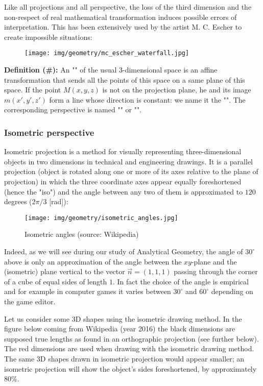 	Like all projections and all perspective, the loss of the third dimension and the non-respect of real mathematical transformation induces possible errors of interpretation. This has been extensively used by the artist M. C. Escher to create impossible situations:
	\begin{figure}[H]
		\centering
		\texttt{[image: img/geometry/mc\_escher\_waterfall.jpg]}
	\end{figure}
	\textbf{Definition (\#\mydef):} An "" of the usual 3-dimensional space is an affine transformation that sends all the points of this space on a same plane of this space. If the point $M (x, y, z)$ is not on the projection plane, he and its image $m (x ', y', z ')$ form a line whose direction is constant: we name it the "". The corresponding perspective is named "" or "".
	
	
	\pagebreak
	\subsubsection{Isometric perspective}
	Isometric projection is a method for visually representing three-dimensional objects in two dimensions in technical and engineering drawings. It is a parallel projection (object is rotated along one or more of its axes relative to the plane of projection) in which the three coordinate axes appear equally foreshortened (hence the "iso") and the angle between any two of them is approximated to $120$ degrees ($2\pi/3$ [rad]):
	\begin{figure}[H]
		\centering
		\texttt{[image: img/geometry/isometric\_angles.jpg]}
		\caption[Isometric angles]{Isometric angles (source: Wikipedia)}
	\end{figure}
	Indeed, as we will see during our study of Analytical Geometry, the angle of $30^\circ$ above is only an approximation of the angle between the $xy$-plane and the (isometric) plane vertical to the vector $\vec{n}=(1,1,1)$ passing through the corner of a cube of equal sides of length $1$. In fact the choice of the angle is empirical and for example in computer games it varies between $30^\circ$ and $60^\circ$ depending on the game editor.
		
	Let us consider some 3D shapes using the isometric drawing method. In the figure below coming from Wikipedia (year 2016) the black dimensions are supposed true lengths as found in an orthographic projection (see further below). The red dimensions are used when drawing with the isometric drawing method. The same 3D shapes drawn in isometric projection would appear smaller; an isometric projection will show the object's sides foreshortened, by approximately $80\%$.
	
